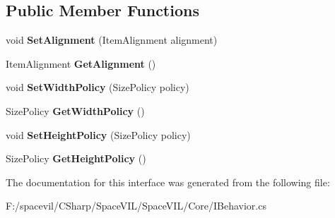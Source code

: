 \subsection*{Public Member Functions}
\begin{DoxyCompactItemize}
\item 
\mbox{\label{interface_space_v_i_l_1_1_core_1_1_i_behavior_a1dac2292f28f54b6ab7a543a372ed3ff}} 
void {\bfseries Set\+Alignment} (Item\+Alignment alignment)
\item 
\mbox{\label{interface_space_v_i_l_1_1_core_1_1_i_behavior_a2eebdc8ff7f573ad44fecd38fc3afefe}} 
Item\+Alignment {\bfseries Get\+Alignment} ()
\item 
\mbox{\label{interface_space_v_i_l_1_1_core_1_1_i_behavior_ad05b17fc4495e98d5acecc52ed87ba0f}} 
void {\bfseries Set\+Width\+Policy} (Size\+Policy policy)
\item 
\mbox{\label{interface_space_v_i_l_1_1_core_1_1_i_behavior_acd5152dbc3db861d85ca0b58f6b83f6d}} 
Size\+Policy {\bfseries Get\+Width\+Policy} ()
\item 
\mbox{\label{interface_space_v_i_l_1_1_core_1_1_i_behavior_ad315b5b729f7b94bcfbf5bd85265a7e8}} 
void {\bfseries Set\+Height\+Policy} (Size\+Policy policy)
\item 
\mbox{\label{interface_space_v_i_l_1_1_core_1_1_i_behavior_aa0a8976a19b412f4f1c564a6a9409ca7}} 
Size\+Policy {\bfseries Get\+Height\+Policy} ()
\end{DoxyCompactItemize}


The documentation for this interface was generated from the following file\+:\begin{DoxyCompactItemize}
\item 
F\+:/spacevil/\+C\+Sharp/\+Space\+V\+I\+L/\+Space\+V\+I\+L/\+Core/I\+Behavior.\+cs\end{DoxyCompactItemize}
